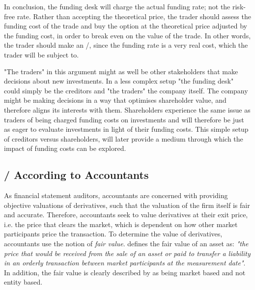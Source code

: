 \documentclass[main.tex]{subfiles}
\begin{document}
            In conclusion, the funding desk will charge the actual funding rate; not the risk-free rate.
            Rather than accepting the theoretical price, the trader should assess the funding cost of the trade 
            and buy the option at the theoretical price adjusted by the funding cost,
            in order to break even on the value of the trade.
            In other words, the trader should make an \FVA/, 
            since the funding rate is a very real cost, which the trader will be subject to.
            
            "The traders" in this argument might as well be other stakeholders that make decisions about new investments.
            In a less complex setup "the funding desk" could simply be the creditors and "the traders" the company itself.
            The company might be making decisions in a way that optimises shareholder value,
            and therefore aligns its interests with them.
            Shareholders experience the same issue as traders of being charged funding costs on investments 
            and will therefore be just as eager to evaluate investments in light of their funding costs.
            This simple setup of creditors versus shareholders, 
            will later provide a medium through which the impact of funding costs can be explored.

        \subsection{\FVA/ According to Accountants}
            As financial statement auditors, accountants are concerned with providing objective valuations of derivatives,
            such that the valuation of the firm itself is fair and accurate.
            Therefore, accountants seek to value derivatives at their exit price, i.e. the price that clears the market,
            which is dependent on how other market participants price the transaction.
            To determine the value of derivatives, accountants use the notion of \textit{fair value}.
            \textcite{IFRS13} defines the fair value of an asset as: 
            \textit{"the price that would be received from the sale of an asset or paid to transfer a liability
            in an orderly transaction between market participants at the measurement date"}.
            In addition, the fair value is clearly described by \textcite{IFRS13} as being market based and not entity based.
\end{document}
